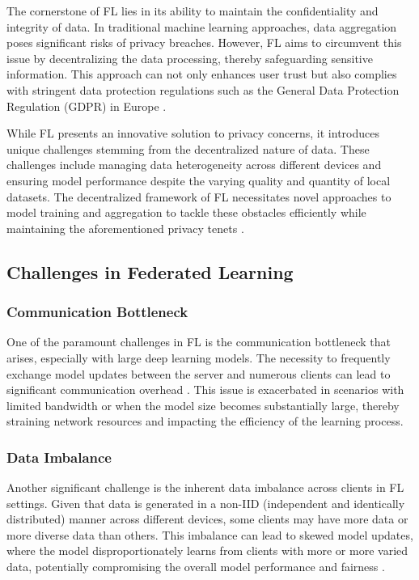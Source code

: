 \documentclass{article}
\begin{document}
The cornerstone of FL lies in its ability to maintain the confidentiality and integrity of data. In traditional machine learning approaches, data aggregation poses significant risks of privacy breaches. However, FL aims to circumvent this issue by decentralizing the data processing, thereby safeguarding sensitive information. This approach can not only enhances user trust but also complies with stringent data protection regulations such as the General Data Protection Regulation (GDPR) in Europe \cite{team2020eu}.\par

While FL presents an innovative solution to privacy concerns, it introduces unique challenges stemming from the decentralized nature of data. These challenges include managing data heterogeneity across different devices and ensuring model performance despite the varying quality and quantity of local datasets. The decentralized framework of FL necessitates novel approaches to model training and aggregation to tackle these obstacles efficiently while maintaining the aforementioned privacy tenets \cite{li2021fedsae}.\par

\subsection{Challenges in Federated Learning}

\subsubsection{Communication Bottleneck}
One of the paramount challenges in FL is the communication bottleneck that arises, especially with large deep learning models. The necessity to frequently exchange model updates between the server and numerous clients can lead to significant communication overhead \cite{nader2020adaptive}. This issue is exacerbated in scenarios with limited bandwidth or when the model size becomes substantially large, thereby straining network resources and impacting the efficiency of the learning process.\par

\subsubsection{Data Imbalance}
Another significant challenge is the inherent data imbalance across clients in FL settings. Given that data is generated in a non-IID (independent and identically distributed) manner across different devices, some clients may have more data or more diverse data than others. This imbalance can lead to skewed model updates, where the model disproportionately learns from clients with more or more varied data, potentially compromising the overall model performance and fairness \cite{10.1093/comjnl/bxac118, jeon2024federated}.\par
\end{document}
